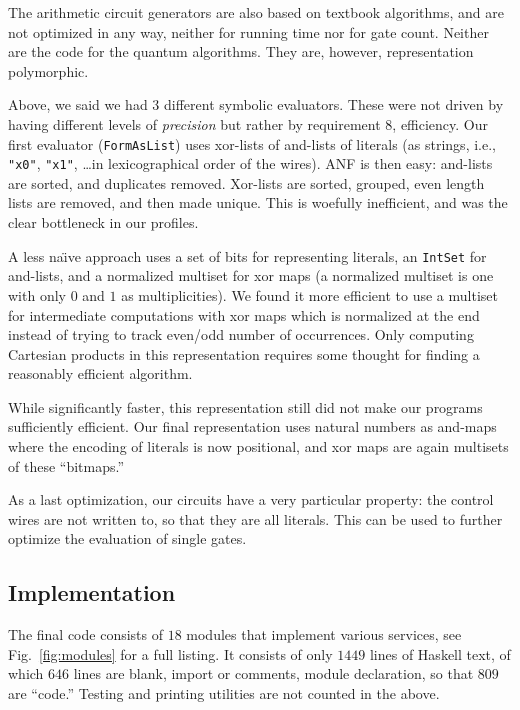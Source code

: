 \documentclass[sigplan,screen]{acmart}
\theoremstyle{definition}
\begin{document}
The arithmetic circuit generators are also based on textbook algorithms, and are
not optimized in any way, neither for running time nor for gate count. Neither are
the code for the quantum algorithms. They are, however, representation
polymorphic.

Above, we said we had $3$ different symbolic evaluators. These were not driven
by having different levels of \emph{precision} but rather by requirement $8$,
efficiency. Our first evaluator (\texttt{FormAsList}) uses xor-lists of
and-lists of literals (as strings, i.e.,
\texttt{"x0"}, \texttt{"x1"}, \ldots in lexicographical order of the wires). ANF
is then easy: and-lists are sorted, and duplicates removed. Xor-lists are sorted,
grouped, even length lists are removed, and then made unique. This is woefully
inefficient, and was the clear bottleneck in our profiles.

A less na\"{\i}ve approach uses a set of bits for representing literals, an
\texttt{IntSet} for and-lists, and a normalized multiset for xor maps (a normalized
multiset is one with only $0$ and $1$ as multiplicities). We found
it more efficient to use a multiset for intermediate computations with xor maps
which is normalized at the end instead of trying to track even/odd number of
occurrences. Only computing Cartesian products in this representation requires
some thought for finding a reasonably efficient algorithm.

While significantly faster, this representation still did not make our programs
sufficiently efficient. Our final representation uses natural numbers as
and-maps where the encoding of literals is now positional, and xor maps are
again multisets of these ``bitmaps.''

As a last optimization, our circuits have a very particular property: the control
wires are not written to, so that they are all literals. This can be used to
further optimize the evaluation of single gates.

\subsection{Implementation}

The final code consists of $18$ modules that implement various
services, see Fig.~\ref{fig:modules} for a full listing. It consists of
only $1449$ lines of Haskell text, of which $646$ lines are blank, import or
comments, module declaration, so that $809$ are ``code.'' Testing and printing
utilities are not counted in the above.
\end{document}
